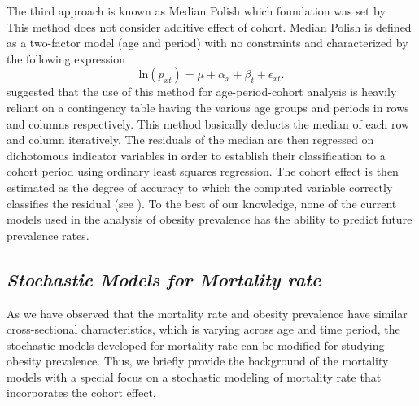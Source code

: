 \documentclass[11pt,letterpaper]{article}
\numberwithin{equation}{section}
\begin{document}
The third approach is known as Median Polish which foundation was set by \cite{Tukey:1977}. This method does not consider additive effect of cohort. Median Polish is defined as a two-factor model (age and period) with no constraints and characterized by the following expression
\begin{equation}
\label{eq:p1a}
\text{ln}(p_{xt})=\mu + \alpha_{x} + \beta_{t} + \epsilon_{xt}.
\end{equation}
\cite{Selvin:2004} suggested that the use of this method for age-period-cohort analysis is heavily reliant on a contingency table having the various age groups and periods in rows and columns respectively. This method basically deducts the median of each row and column iteratively. The residuals of the median are then regressed on dichotomous indicator variables in order to establish their classification to a cohort period using ordinary least squares regression. The cohort effect is then estimated as the degree of accuracy to which the computed variable correctly classifies the residual (see \cite{Keyes+Utz+Robinson+Li:2010}). To the best of our knowledge, none of the current models used in the analysis of obesity prevalence has the ability to predict future prevalence rates.

\subsection{\textit{Stochastic Models for  Mortality rate}}
As we have observed that the mortality rate and obesity prevalence have similar cross-sectional characteristics, which is varying across age and time period,   the stochastic models developed for mortality rate can be modified for studying obesity prevalence. Thus, we briefly provide the background of the mortality models with a special focus on a stochastic modeling of mortality rate that incorporates the cohort effect.
\end{document}
